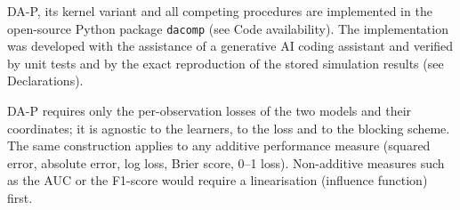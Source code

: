 \begin{remark}[Implementation]
DA-P, its kernel variant and all competing procedures are implemented in the open-source Python package \texttt{dacomp} (see Code availability). The implementation was developed with the assistance of a generative AI coding assistant and verified by unit tests and by the exact reproduction of the stored simulation results (see Declarations).
\end{remark}

\begin{remark}[Scope]
DA-P requires only the per-observation losses of the two models and their coordinates; it is agnostic to the learners, to the loss and to the blocking scheme. The same construction applies to any additive performance measure (squared error, absolute error, log loss, Brier score, 0--1 loss). Non-additive measures such as the AUC or the F1-score would require a linearisation (influence function) first.
\end{remark}
